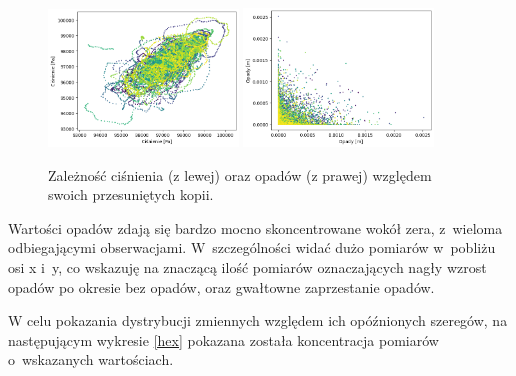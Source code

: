 \begin{figure}[H]
    \centering
    \includegraphics[width=0.45\textwidth]{images/pressure_scatter.png}
    \includegraphics[width=0.45\textwidth]{images/precipitation_scatter.png}
    \caption{Zależność ciśnienia (z lewej) oraz opadów (z prawej) względem 
    swoich przesuniętych kopii.}
    \label{pressure-precipitation}
\end{figure}

Wartości opadów zdają się bardzo mocno skoncentrowane wokół zera, z~wieloma 
odbiegającymi obserwacjami. W~szczególności widać dużo pomiarów w~pobliżu 
osi x i~y, co wskazuję na znaczącą ilość pomiarów oznaczających nagły wzrost opadów
po okresie bez opadów, oraz gwałtowne zaprzestanie opadów.

W celu pokazania dystrybucji zmiennych względem ich opóźnionych szeregów, na następującym 
wykresie \ref{hex} pokazana została koncentracja pomiarów o~wskazanych wartościach.

